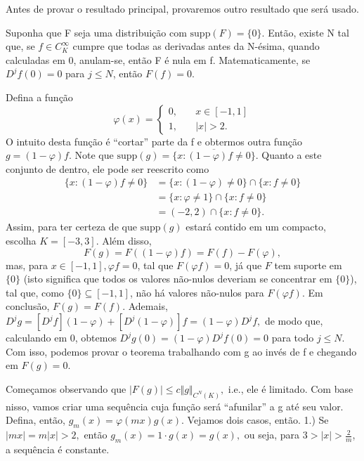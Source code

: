 \documentclass[MeasureTheory/measure_theory.tex]{subfiles}
\begin{document}
Antes de provar o resultado principal, provaremos outro resultado que será usado.
\begin{prop*}
	Suponha que F seja uma distribuição com \(\mathrm{supp}(F) = \{0\}\). Então, existe N tal que, se \(f\in C_{K}^{\infty}\) cumpre que todas as derivadas antes da N-ésima, quando calculadas em 0, anulam-se, então F é nula em f. Matematicamente, se \(D^{j}f(0) = 0\) para
	\(j\leq N\), então \(F(f) = 0\).
\end{prop*}
\begin{proof*}
	Defina a função
	\[
		\varphi (x) = \left\{\begin{array}{ll}
			0,\quad & x\in [-1, 1] \\
			1,\quad & |x| > 2.
		\end{array}\right.
	\]
	O intuito desta função é ``cortar'' parte da f e obtermos outra função \(g = (1-\varphi )f.\) Note que \(\mathrm{supp}(g) = \overline{\{x: (1-\varphi )f\neq 0\}}.\) Quanto a este conjunto de dentro, ele pode ser reescrito como
	\begin{align*}
		\{x: (1-\varphi )f\neq 0\} & = \{x:(1-\varphi)\neq0\}\cap \{x: f\neq 0\} \\
		                           & = \{x: \varphi \neq 1\}\cap \{x: f\neq 0\}  \\
		                           & = (-2, 2)\cap \{x:f\neq 0\}.
	\end{align*}
	Assim, para ter certeza de que \(\mathrm{supp}(g)\) estará contido em um compacto, escolha \(K = [-3, 3].\) Além disso,
	\[
		F(g) = F((1-\varphi )f) = F(f) - F(\varphi ),
	\]
	mas, para \(x\in [-1, 1], \varphi f = 0\), tal que \(F(\varphi f) = 0\), já que \(F\) tem suporte em \(\{0\}\) (isto significa que todos os valores não-nulos deveriam se concentrar em \(\{0\}\)), tal que, como \(\{0\}\subseteq [-1, 1]\), não há valores não-nulos para \(F(\varphi f).\)
	Em conclusão, \(F(g) = F(f).\) Ademais, \(D^{j}g = [D^{j}f](1-\varphi ) + [D^{j}(1-\varphi )]f = (1-\varphi )D^{j}f,\) de modo que, calculando em 0, obtemos \(D^{j}g(0) = (1-\varphi )D^{j}f(0) = 0\) para todo \(j\leq N\). Com isso, podemos provar o teorema trabalhando com g ao invés de f e chegando em \(F(g) = 0.\)

	Começamos observando que \(|F(g)|\leq c\Vert g \Vert_{C^{N}(K)},\) i.e., ele é limitado. Com base nisso, vamos criar uma sequência cuja função será ``afunilar'' a g até seu valor. Defina, então, \(g_{m}(x)=\varphi (mx)g(x).\) Vejamos dois casos, então.
	1.) Se \(|mx| = m|x| > 2, \) então \(g_{m}(x) = 1 \cdot g(x) = g(x),\) ou seja, para \(3 > |x| >\frac{2}{m}\), a sequência é constante.


\end{proof*}
\end{document}
